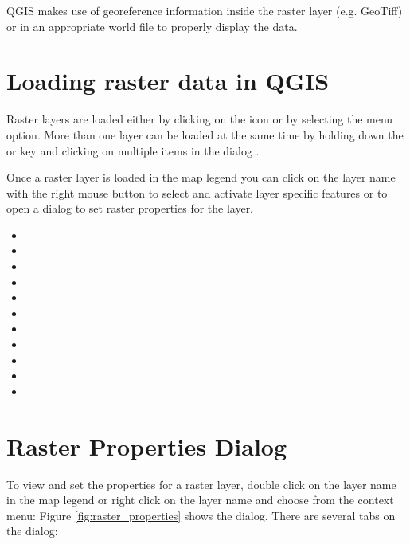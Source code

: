 QGIS makes use of georeference information inside the raster layer (e.g. GeoTiff)
or in an appropriate world file to properly display the data.

\section{Loading raster data in QGIS}\label{label_loadraster}

Raster layers are loaded either by clicking on the
 icon or by
selecting the  \arrow {}
menu option. More than one layer can be loaded at the same time by holding down the
 or  key and clicking on multiple items
in the dialog .

Once a raster layer is loaded in the map legend you can click on the layer name with the
right mouse button to select and activate layer specific features or to open
a dialog to set raster properties for the layer.


\begin{itemize}[label=--]
\item {}
\item {}
\item {}
\item {}
\item {}
\item {}
\item {}
\item {}
\item {}
\item {}
\item {}
\end{itemize}

\section{Raster Properties Dialog}\label{label_rasterprop}

To view and set the properties for a raster layer, double click
on the layer name in the map legend or right click on the layer name and choose
 from the context menu:
Figure \ref{fig:raster_properties} shows the  dialog.
There are several tabs on the dialog:

